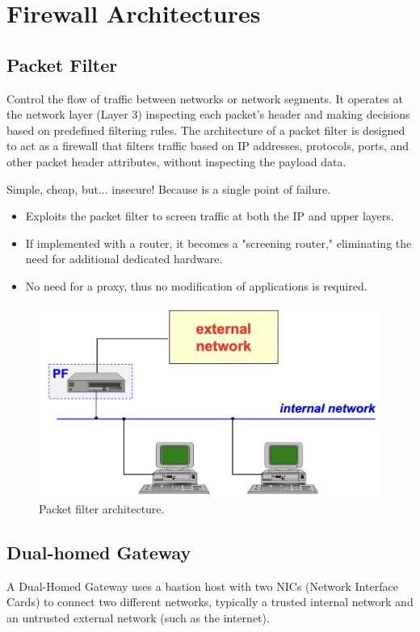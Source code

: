 \section{Firewall Architectures}
\subsection{Packet Filter}
Control the flow of traffic between networks or network segments. It operates at the network layer (Layer 3) inspecting each packet's header and making decisions based on predefined filtering rules. The architecture of a packet filter is designed to act as a firewall that filters traffic based on IP addresses, protocols, ports, and other packet header attributes, without inspecting the payload data.

\begin{tcolorbox}[colback=red!10!white, colframe=red!70!black, coltitle=white, title=Beware]
    Simple, cheap, but... insecure! Because is a single point of failure.
\end{tcolorbox}

\begin{itemize}
    \item Exploits the packet filter to screen traffic at both the IP and upper layers.
    \item If implemented with a router, it becomes a "screening router," eliminating the need for additional dedicated hardware.
    \item No need for a proxy, thus no modification of applications is required.
\end{itemize}

\begin{figure}[H]
    \centering
    \includegraphics[width=0.5\linewidth]{Images/Firewalling/packet_filter.png}
    \caption{Packet filter architecture.}
\end{figure}

\subsection{Dual-homed Gateway}
A Dual-Homed Gateway uses a bastion host with two NICs (Network Interface Cards) to connect two different networks, typically a trusted internal network and an untrusted external network (such as the internet). 

